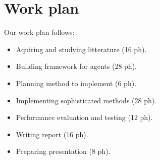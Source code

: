\documentclass{article}
\begin{document}
\section{Work plan}
Our work plan follows:

\begin{itemize}
\item Aquiring and studying litterature (16 ph).
\item Building framework for agents (28 ph).
\item Planning method to implement (6 ph).
\item Implementing sophisticated methods (28 ph).
\item Performance evaluation and testing (12 ph).
\item Writing report (16 ph).
\item Preparing presentation (8 ph).

\end{itemize}
\end{document}
